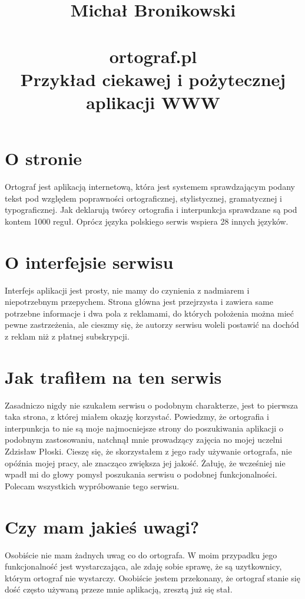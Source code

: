 \documentclass[10pt,a4paper]{article}
\title{Michał Bronikowski\protect \\ \hfill \\ ortograf.pl \\Przykład ciekawej i pożytecznej aplikacji WWW } %
\begin{document}
\maketitle  %
\thispagestyle{empty}
\vfill
\newpage
\tableofcontents
\newpage
\large
\section{O stronie}
Ortograf jest aplikacją internetową, która jest systemem sprawdzającym podany tekst pod względem poprawności ortograficznej, stylistycznej, gramatycznej i typograficznej. Jak deklarują twórcy ortografia i interpunkcja sprawdzane są pod kontem 1000 reguł. Oprócz języka polskiego serwis wspiera 28 innych języków.
\section{O interfejsie serwisu}
Interfejs aplikacji jest prosty, nie mamy do czynienia z nadmiarem i niepotrzebnym przepychem. Strona główna jest przejrzysta i zawiera same potrzebne informacje i dwa pola z reklamami, do których położenia można mieć pewne zastrzeżenia, ale cieszmy się, że autorzy serwisu woleli postawić na dochód z reklam niż z płatnej subskrypcji.
\section{Jak trafiłem na ten serwis}
Zasadniczo nigdy nie szukałem serwisu o podobnym charakterze, jest to pierwsza taka strona, z której miałem okazję korzystać. Powiedzmy, że ortografia i interpunkcja to nie są moje najmocniejsze strony do poszukiwania aplikacji o podobnym zastosowaniu, natchnął mnie prowadzący zajęcia no mojej uczelni Zdzisław Płoski. Cieszę się, że skorzystałem z jego rady używanie ortografa, nie opóźnia mojej pracy, ale znacząco zwiększa jej jakość. Żałuję, że wcześniej nie wpadł mi do głowy pomysł poszukania serwisu o podobnej funkcjonalności. Polecam wszystkich wypróbowanie tego serwisu.
\section{Czy mam jakieś uwagi?}
Osobiście nie mam żadnych uwag co do ortografa. W moim przypadku jego funkcjonalność jest wystarczająca, ale zdaję sobie sprawę, że są uzytkownicy, którym ortograf nie wystarczy. Osobiście jestem przekonany, że ortograf stanie się dość często używaną przeze mnie aplikacją, zresztą już się stał.
\end{document}

